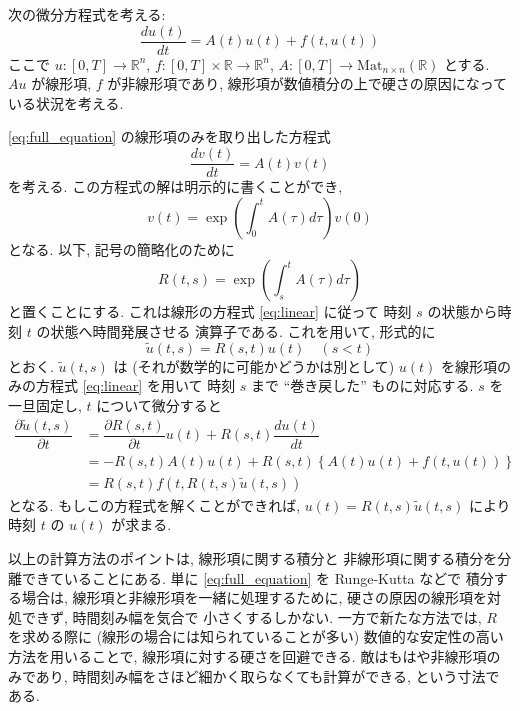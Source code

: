 \documentclass[12pt, a4j]{jsarticle}
\newcommand{\R}{\mathbb{R}}
\begin{document}
次の微分方程式を考える:
\begin{equation}
 \dfrac{d u(t)}{d t}
  = A(t) u(t) + f(t, u(t))
  \label{eq:full_equation}
\end{equation}
ここで 
$u \colon [0, T] \to \R^{n}$,
$f \colon [0, T] \times \R \to \R^{n}$,
$A \colon [0, T] \to \mathrm{Mat}_{n \times n}(\R)$
とする. $A u$ が線形項, $f$ が非線形項であり,
線形項が数値積分の上で硬さの原因になっている状況を考える.

\eqref{eq:full_equation} の線形項のみを取り出した方程式
\begin{equation}
 \dfrac{d v(t)}{d t} = A(t) v(t)
  \label{eq:linear}
\end{equation}
を考える. この方程式の解は明示的に書くことができ,
\begin{equation}
 v(t) = \exp{\left( \int_{0}^{t} A(\tau) d \tau \right)} v(0)
  \label{eq:sol_linear}
\end{equation}
となる. 以下, 記号の簡略化のために
\begin{equation}
 R(t, s) = \exp{\left( \int_{s}^{t} A(\tau) d \tau \right)}
\end{equation}
と置くことにする. これは線形の方程式 \eqref{eq:linear} に従って
時刻 $s$ の状態から時刻 $t$ の状態へ時間発展させる
演算子である. これを用いて, 形式的に
\begin{equation}
 \tilde{u}(t, s) = R(s, t) u(t)
  \quad (s < t)
\end{equation}
とおく. $\tilde{u}(t, s)$ は 
(それが数学的に可能かどうかは別として)
$u(t)$ を線形項のみの方程式 \eqref{eq:linear} を用いて
時刻 $s$ まで ``巻き戻した'' ものに対応する.
$s$ を一旦固定し, $t$ について微分すると
\begin{align}
 \dfrac{\partial \tilde{u}(t, s)}{\partial t}
 &= \dfrac{\partial R(s, t)}{\partial t} u(t)
    + R(s, t) \dfrac{d u(t)}{d t}
 \\
 &= - R(s, t) A(t) u(t) 
    + R(s, t) \left\{ A(t) u(t) + f(t, u(t)) \right\}
 \\
 &= R(s, t) f(t, R(t, s) \tilde{u}(t, s))
 \label{eq:nonlin_part}
\end{align}
となる. もしこの方程式を解くことができれば,
$u(t) = R(t, s) \tilde{u}(t, s)$
により時刻 $t$ の $u(t)$ が求まる. \par

以上の計算方法のポイントは, 線形項に関する積分と
非線形項に関する積分を分離できていることにある.
単に \eqref{eq:full_equation} を Runge-Kutta などで
積分する場合は, 線形項と非線形項を一緒に処理するために,
硬さの原因の線形項を対処できず, 時間刻み幅を気合で
小さくするしかない. 一方で新たな方法では,
$R$ を求める際に (線形の場合には知られていることが多い)
数値的な安定性の高い方法を用いることで,
線形項に対する硬さを回避できる. 敵はもはや非線形項のみであり,
時間刻み幅をさほど細かく取らなくても計算ができる, という寸法である.
\end{document}
